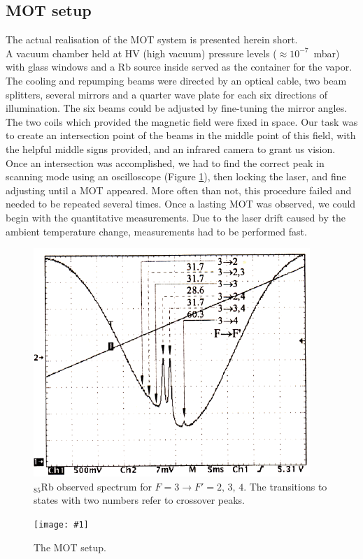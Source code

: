 \documentclass[twocolumn]{article}
\newcommand{\insertFigure}[1]{%
   \texttt{[image: \#1]}%
}
\begin{document}
\subsection{MOT setup}
The actual realisation of the MOT system is presented herein short.\\
A vacuum chamber held at HV (high vacuum) pressure levels ($\approx 10^{-7}$~mbar) with glass windows and a Rb source inside served as the container for the vapor. The cooling and repumping beams were directed by an optical cable, two beam splitters, several mirrors and a quarter wave plate for each six directions of illumination. The six beams could be adjusted by fine-tuning the mirror angles. The two coils which provided the magnetic field were fixed in space. Our task was to create an intersection point of the beams in the middle point of this field, with the helpful middle signs provided, and an infrared camera to grant us vision. Once an intersection was accomplished, we had to find the correct peak in scanning mode using an oscilloscope (Figure \ref{fig:Peaks}), then locking the laser, and fine adjusting until a MOT appeared. More often than not, this procedure failed and needed to be repeated several times. Once a lasting MOT was observed, we could begin with the quantitative measurements. Due to the laser drift caused by the ambient temperature change, measurements had to be performed fast.
\begin{figure}
	\centering
	\includegraphics[scale=0.5]{Images/Peaks.png}
	\caption{$_{85}$Rb observed spectrum for $F = 3 \rightarrow F' = 2, \, 3, \, 4$. The transitions to states with two numbers refer to crossover peaks.\cite{manual}}
	\label{fig:Peaks}
\end{figure}
\begin{figure} [!h]
	\centering
	\insertFigure{Images/MOT.png}
	\caption{The MOT setup.\cite{manual}}
	\label{fig:MOT}
\end{figure}
\end{document}
